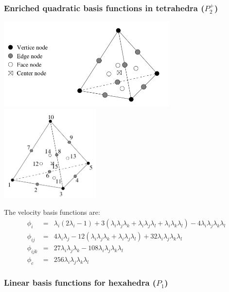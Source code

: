 \subsubsection{Enriched quadratic basis functions in tetrahedra ($P_2^+$)}

\includegraphics[width=9cm]{images/crouzeix-raviart/p2pp1_3D1}
\includegraphics[width=5cm]{images/crouzeix-raviart/p2pp1_3D2}

The velocity basis functions are:
\begin{eqnarray}
\phi_i &=& \lambda_i(2\lambda_i-1) + 3 (\lambda_i\lambda_j \lambda_k + \lambda_i\lambda_j\lambda_l + \lambda_i\lambda_k\lambda_l) -4 \lambda_i\lambda_j\lambda_k\lambda_l \\
\phi_{ij} &=& 4\lambda_i\lambda_j - 12( \lambda_i\lambda_j\lambda_k+\lambda_i\lambda_j\lambda_l  ) +32 \lambda_i\lambda_j\lambda_k \lambda_l \\
\phi_{ijk} &=& 27  \lambda_i\lambda_j\lambda_k - 108 \lambda_i\lambda_j\lambda_k \lambda_l \\
\phi_c &=& 256 \lambda_i\lambda_j\lambda_k\lambda_l
\end{eqnarray}


\subsubsection{Linear basis functions for hexahedra ($P_1$)} \label{ss:lbfh3D}

